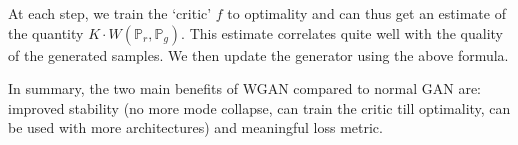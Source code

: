 At each step, we train the `critic' $f$ to optimality and can thus get an
estimate of the quantity $K \cdot W(\mathbb{P}_r, \mathbb{P}_g)$. This
estimate correlates quite well with the quality of the generated samples.
We then update the generator using the above formula.

In summary, the two main benefits of WGAN compared to normal GAN are:
improved stability (no more mode collapse, can train the critic till
optimality, can be used with more architectures) and meaningful loss metric.
